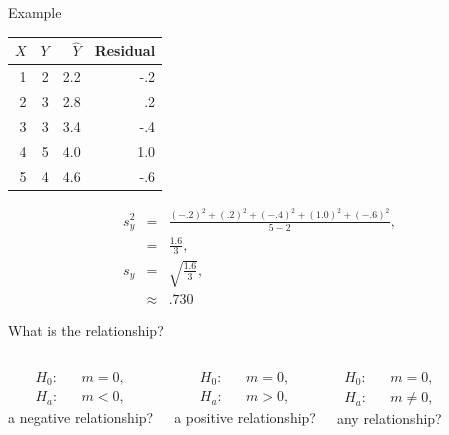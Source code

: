 \begin{frame}{Example}

  \begin{tabular}{r|r|r|r}
    $X$ & $Y$ & $\hat{Y}$ & Residual \\ \hline
    1 & 2 & 2.2 & -.2 \\
    2 & 3 & 2.8 &  .2 \\
    3 & 3 & 3.4 & -.4 \\
    4 & 5 & 4.0 & 1.0  \\
    5 & 4 & 4.6 & -.6
  \end{tabular}

  \begin{eqnarray*}
    s^2_y & = & \frac{ (-.2)^2 + (.2)^2 + (-.4)^2 + (1.0)^2 + (-.6)^2}{5-2}, \\
    & = & \frac{1.6}{3}, \\
    s_y & = & \sqrt{\frac{1.6}{3}}, \\
    & \approx & .730
  \end{eqnarray*}
  
\end{frame}
  

\begin{frame}{What is the relationship?}


    \begin{columns}

      \begin{eqnarray*}
        H_0: & & m=0, \\
        H_a: & & m<0,
      \end{eqnarray*}
      a negative relationship?


      \begin{eqnarray*}
        H_0: & & m=0, \\
        H_a: & & m>0,
      \end{eqnarray*}
      a positive relationship?



      \begin{eqnarray*}
        H_0: & & m=0, \\
        H_a: & & m\neq 0,
      \end{eqnarray*}
      any relationship?

      
    \end{columns}

  
\end{frame}





